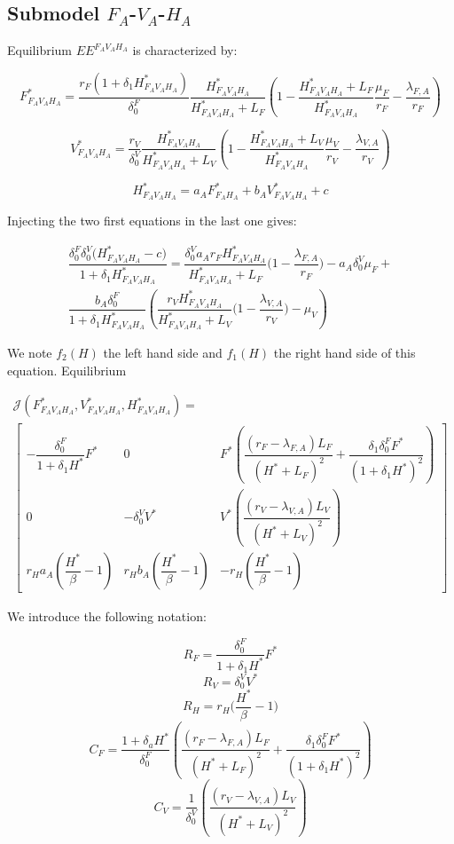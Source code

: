 \documentclass{article}
\newcommand{\lfa}{\lambda_{F, A}}
\newcommand{\lva}{\lambda_{V, A}}
\newcommand{\df}{\delta_0^F}
\newcommand{\dv}{\delta_0^V}
\begin{document}
\subsection{Submodel $F_A$-$V_A$-$H_A$}
Equilibrium $EE^{F_AV_AH_A}$ is characterized by:

$$
F^*_{F_AV_AH_A} = \dfrac{r_F(1+\delta_1 H^*_{F_AV_AH_A})}{\df}\dfrac{H^*_{F_AV_AH_A}}{H^*_{F_AV_AH_A} + L_F}\left(1 - \dfrac{H^*_{F_AV_AH_A} + L_F}{H^*_{F_AV_AH_A}}\dfrac{\mu_F}{r_F} - \dfrac{\lfa}{r_F}\right)
$$

$$
V^*_{F_AV_AH_A} = \dfrac{r_V}{\dv}\dfrac{H^*_{F_AV_AH_A}}{H^*_{F_AV_AH_A} + L_V}\left(1 - \dfrac{H^*_{F_AV_AH_A} + L_V}{H^*_{F_AV_AH_A}}\dfrac{\mu_V}{r_V} - \dfrac{\lva}{r_V}\right)
$$

$$
H^*_{F_AV_AH_A} = a_A F^*_{F_AH_A} + b_A V^*_{F_AV_AH_A} + c
$$

Injecting the two first equations in the last one gives:

\begin{multline}
\dfrac{\df \dv \Big(H^*_{F_AV_AH_A} -c\Big)}{1 + \delta_1 H^*_{F_AV_AH_A}} = \dfrac{\dv a_A r_F H^*_{F_AV_AH_A} }{H^*_{F_AV_AH_A} +L_F} \Big(1 - \dfrac{\lfa}{r_F} \Big) - a_A \dv \mu_F + \\
\dfrac{b_A \df}{1 + \delta_1 H^*_{F_AV_AH_A} } \left( \dfrac{ r_V H^*_{F_AV_AH_A} }{H^*_{F_AV_AH_A} +L_V} \Big(1 - \dfrac{\lva}{r_V} \Big) - \mu_V \right)
\end{multline}

We note $f_2(H)$ the left hand side and $f_1(H)$ the right hand side of this equation. Equilibrium 



\begin{multline}
\mathcal{J}(F^*_{F_AV_AH_A}, V^*_{F_AV_AH_A}, H^*_{F_AV_AH_A}) = \\ \begin{bmatrix}
- \dfrac{\df}{1 + \delta_1 H^*}F^* & 0 & F^* \left( \dfrac{(r_F - \lfa)L_F}{(H^* + L_F)^2} + \dfrac{\delta_1 \df F^*}{(1 + \delta_1 H^*)^2} \right) \\
0 & - \dv V^* & V^* \left( \dfrac{(r_V - \lva)L_V}{(H^* + L_V)^2} \right) \\
r_H a_A (\dfrac{H^*}{\beta} - 1)&r_H b_A (\dfrac{H^*}{\beta} - 1) & -r_H(\dfrac{H^*}{\beta} - 1)
\end{bmatrix}
\end{multline}

We introduce the following notation:

$$
R_F = \dfrac{\df}{1 + \delta_1 H^*} F^*
$$
$$
R_V = \dv V^*
$$
$$
R_H = r_H\Big(\dfrac{H^*}{\beta} - 1\Big)
$$
$$
C_F = \dfrac{1 + \delta_a H^*}{\df} \left( \dfrac{(r_F - \lfa)L_F}{(H^* + L_F)^2} + \dfrac{\delta_1 \df F^*}{(1 + \delta_1 H^*)^2} \right)
$$
$$C_V = \dfrac{1}{\dv} \left( \dfrac{(r_V - \lva)L_V}{(H^* + L_V)^2} \right) $$
\end{document}
